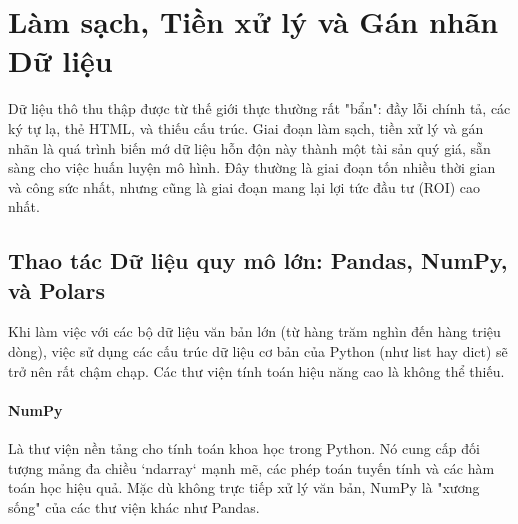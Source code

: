 
\section{Làm sạch, Tiền xử lý và Gán nhãn Dữ liệu}
\label{sec:data_cleaning_labeling}

Dữ liệu thô thu thập được từ thế giới thực thường rất "bẩn": đầy lỗi chính tả, các ký tự lạ, thẻ HTML, và thiếu cấu trúc. Giai đoạn làm sạch, tiền xử lý và gán nhãn là quá trình biến mớ dữ liệu hỗn độn này thành một tài sản quý giá, sẵn sàng cho việc huấn luyện mô hình. Đây thường là giai đoạn tốn nhiều thời gian và công sức nhất, nhưng cũng là giai đoạn mang lại lợi tức đầu tư (ROI) cao nhất.

\subsection{Thao tác Dữ liệu quy mô lớn: Pandas, NumPy, và Polars}
\label{ssec:data_manipulation_tools}
Khi làm việc với các bộ dữ liệu văn bản lớn (từ hàng trăm nghìn đến hàng triệu dòng), việc sử dụng các cấu trúc dữ liệu cơ bản của Python (như list hay dict) sẽ trở nên rất chậm chạp. Các thư viện tính toán hiệu năng cao là không thể thiếu.

\paragraph{NumPy}
Là thư viện nền tảng cho tính toán khoa học trong Python. Nó cung cấp đối tượng mảng đa chiều `ndarray` mạnh mẽ, các phép toán tuyến tính và các hàm toán học hiệu quả. Mặc dù không trực tiếp xử lý văn bản, NumPy là "xương sống" của các thư viện khác như Pandas.

